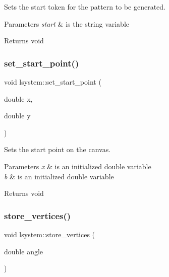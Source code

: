 Sets the start token for the pattern to be generated. 


\begin{DoxyParams}{Parameters}
{\em \textquotesingle{}start\textquotesingle{}} & is the string variable \\
\hline
\end{DoxyParams}
\begin{DoxyReturn}{Returns}
void 
\end{DoxyReturn}
\mbox{\label{classlsystem_a8cc22353ac642e18e51168c891325330}} 
\subsubsection{\texorpdfstring{set\+\_\+start\+\_\+point()}{set\_start\_point()}}
{\footnotesize\ttfamily void lsystem\+::set\+\_\+start\+\_\+point (\begin{DoxyParamCaption}\item[{double}]{x,  }\item[{double}]{y }\end{DoxyParamCaption})}



Sets the start point on the canvas. 


\begin{DoxyParams}{Parameters}
{\em x} & is an initialized double variable \\
\hline
{\em b} & is an initialized double variable \\
\hline
\end{DoxyParams}
\begin{DoxyReturn}{Returns}
void 
\end{DoxyReturn}
\mbox{\label{classlsystem_afae86314472d289ed31a72bfb5fb4497}} 
\subsubsection{\texorpdfstring{store\+\_\+vertices()}{store\_vertices()}}
{\footnotesize\ttfamily void lsystem\+::store\+\_\+vertices (\begin{DoxyParamCaption}\item[{double}]{angle }\end{DoxyParamCaption})}



